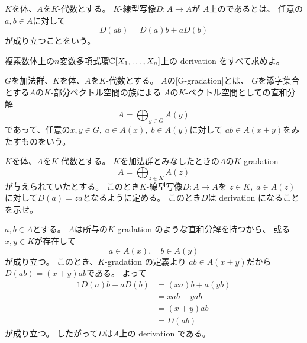\documentclass[report]{jlreq}
\begin{document}
\begin{definition}[derivation]
    $K$を体、$A$を$K$-代数とする。
    $K$-線型写像$D \colon A \to A$が
    $A$上のであるとは、
    任意の$a, b \in A$に対して
    \begin{equation}
        D(ab) = D(a) b + a D(b)
    \end{equation}
    が成り立つことをいう。
\end{definition}

\begin{problem}[代数学II 3.43]
    複素数体上の$n$変数多項式環$\mathbb{C}[X_1, \dots, X_n]$上の
    derivation をすべて求めよ。
\end{problem}

\begin{answer}
\end{answer}


\begin{definition}[$G$-gradation]
    $G$を加法群、$K$を体、$A$を$K$-代数とする。
    $A$の[G-gradation]とは、
    $G$を添字集合とする$A$の$K$-部分ベクトル空間の族による
    $A$の$K$-ベクトル空間としての直和分解
    \begin{equation}
        A = \bigoplus_{g \in G} A(g)
    \end{equation}
    であって、任意の$x, y \in G, \; a \in A(x), \; b \in A(y)$に対して
    $ab \in A(x + y)$をみたすものをいう。
\end{definition}

\begin{problem}[代数学II 3.44]
    $K$を体、$A$を$K$-代数とする。
    $K$を加法群とみなしたときの$A$の$K$-gradation
    \begin{equation}
        A = \bigoplus_{z \in K} A(z)
    \end{equation}
    が与えられていたとする。
    このとき$K$-線型写像$D \colon A \to A$を
    $z \in K, \; a \in A(z)$に対して$D(a) = za$となるように定める。
    このとき$D$は derivation になることを示せ。
\end{problem}

\begin{answer}
    $a, b \in A$とする。
    $A$は所与の$K$-gradation のような直和分解を持つから、
    或る$x, y \in K$が存在して
    \begin{equation}
        a \in A(x), \quad b \in A(y)
    \end{equation}
    が成り立つ。
    このとき、$K$-gradation の定義より
    $ab \in A(x + y)$だから
    $D(ab) = (x + y) ab$である。
    よって
    \begin{alignat}{1}
        D(a) b + a D(b)
            &= (xa) b + a (yb) \\
            &= xab + yab \\
            &= (x + y) ab \\
            &= D(ab)
    \end{alignat}
    が成り立つ。
    したがって$D$は$A$上の derivation である。
\end{answer}
\end{document}
